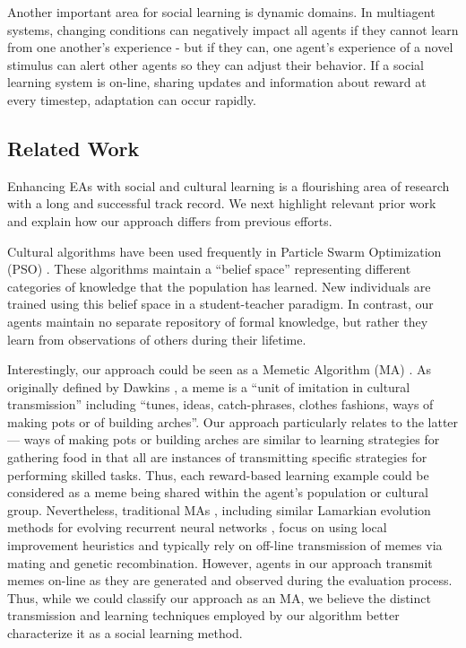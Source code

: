 \documentclass{acm_proc_article-sp}
\begin{document}
Another important area for social learning is dynamic domains. In multiagent systems, changing conditions can negatively impact all agents if they cannot learn from one another's experience - but if they can, one agent's experience of a novel stimulus can alert other agents so they can adjust their behavior. If a social learning system is on-line, sharing updates and information about reward at every timestep, adaptation can occur rapidly.

\subsection*{Related Work}

Enhancing EAs with social and cultural learning is a flourishing area of research with a long and successful track record. We next highlight relevant prior work and explain how our approach differs from previous efforts.

Cultural algorithms \cite{reynolds1994introduction} have been used frequently in Particle Swarm Optimization (PSO) \cite{kennedy1995particle}. These algorithms maintain a ``belief space'' representing different categories of knowledge that the population has learned. New individuals are trained using this belief space in a student-teacher paradigm. In contrast, our agents maintain no separate repository of formal knowledge, but rather they learn from observations of others during their lifetime.

Interestingly, our approach could be seen as a Memetic Algorithm (MA) \cite{moscato1989evolution}. As originally defined by Dawkins \cite{dawkins2006selfish}, a meme is a ``unit of imitation in cultural transmission'' including ``tunes, ideas, catch-phrases, clothes fashions, ways of making pots or of building arches''. Our approach particularly relates to the latter--- ways of making pots or building arches are similar to learning strategies for gathering food in that all are instances of transmitting specific strategies for performing skilled tasks. Thus, each reward-based learning example could be considered as a meme being shared within the agent's population or cultural group. Nevertheless, traditional MAs \cite{onwubolu2004new}, including similar Lamarkian evolution methods for evolving recurrent neural networks \cite{ku2000study}, focus on using local improvement heuristics and typically rely on off-line transmission of memes via mating and genetic recombination. However, agents in our approach transmit memes on-line as they are generated and observed during the evaluation process. Thus, while we could classify our approach as an MA, we believe the distinct transmission and learning techniques employed by our algorithm better characterize it as a social learning method.
\end{document}
